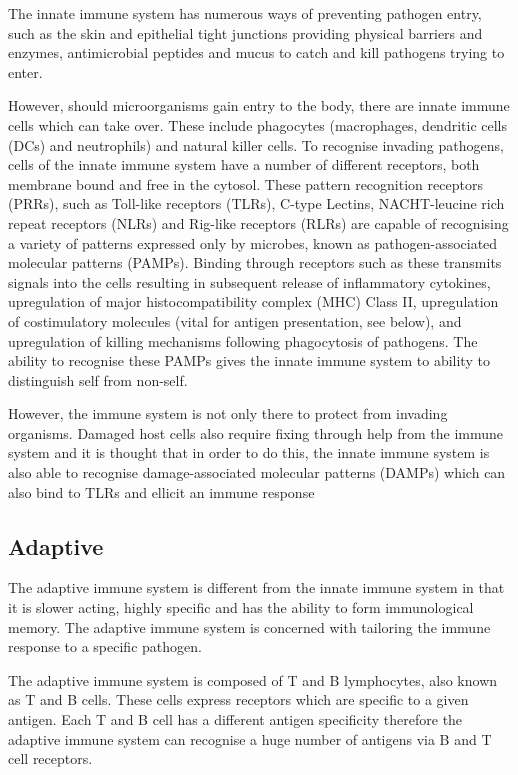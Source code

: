 The innate immune system has numerous ways of preventing pathogen entry, such as the skin and epithelial tight junctions providing physical barriers and enzymes, antimicrobial peptides and mucus to catch and kill pathogens trying to enter.

However, should microorganisms gain entry to the body, there are innate immune cells which can take over.
These include phagocytes (macrophages, dendritic cells (DCs) and neutrophils) and natural killer cells. 
To recognise invading pathogens, cells of the innate immune system have a number of different receptors, both membrane bound and free in the cytosol.
These pattern recognition receptors (PRRs), such as Toll-like receptors (TLRs), C-type Lectins, NACHT-leucine rich repeat receptors (NLRs) and Rig-like receptors (RLRs) are capable of recognising a variety of patterns expressed only by microbes, known as pathogen-associated molecular patterns (PAMPs).
Binding through receptors such as these transmits signals into the cells resulting in subsequent release of inflammatory cytokines, upregulation of major histocompatibility complex (MHC) Class II, upregulation of costimulatory molecules (vital for antigen presentation, see below), and upregulation of killing mechanisms following phagocytosis of pathogens.
The ability to recognise these PAMPs gives the innate immune system to ability to distinguish self from non-self.

However, the immune system is not only there to protect from invading organisms. 
Damaged host cells also require fixing through help from the immune system and it is thought that in order to do this, the innate immune system is also able to recognise damage-associated molecular patterns (DAMPs) which can also bind to TLRs and ellicit an immune response \citep{Matzinger1994, Shin2015}


\subsection{Adaptive}

The adaptive immune system is different from the innate immune system in that it is slower acting, highly specific and has the ability to form immunological memory.
The adaptive immune system is concerned with tailoring the immune response to a specific pathogen.

The adaptive immune system is composed of T and B lymphocytes, also known as T and B cells.
These cells express receptors which are specific to a given antigen.
Each T and B cell has a different antigen specificity therefore the adaptive immune system can recognise a huge number of antigens via B and T cell receptors.

